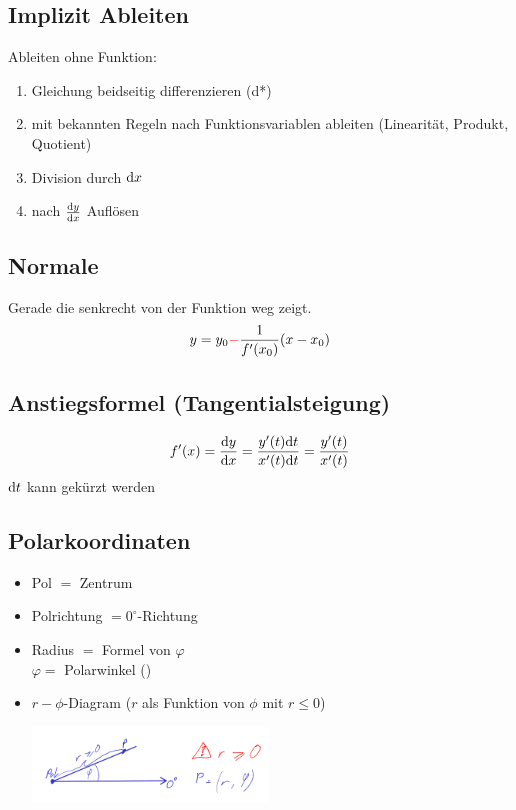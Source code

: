 \subsection{Implizit Ableiten}
Ableiten ohne Funktion:
\begin{enumerate}
\item Gleichung beidseitig differenzieren (d*)
\item mit bekannten Regeln nach Funktionsvariablen ableiten (Linearität, Produkt, Quotient)
\item Division durch $\mathrm{d}x$
\item nach $\frac{\mathrm{d}y}{\mathrm{d}x}$ Auflösen
\end{enumerate}

\subsection{Normale}
Gerade die senkrecht von der Funktion weg zeigt.
\[
y = y_0{\color{red}-}\frac{1}{f'(x_0)}(x-x_0)
\]

\subsection{Anstiegsformel (Tangentialsteigung)}
\[
f'(x)=\frac{\mathrm{d}y}{\mathrm{d}x}=\frac{y'(t)\mathrm{d}t}{x'(t)\mathrm{d}t}=\frac{y'(t)}{x'(t)}
\]
$\mathrm{d}t$ kann gekürzt werden

\subsection{Polarkoordinaten}
\begin{itemize}
\item Pol $=$ Zentrum
\item Polrichtung $= 0^{\circ}$-Richtung
\item Radius $=$ Formel von $\varphi$\\
$\varphi = $ Polarwinkel ()
\end{itemize}

\begin{itemize}
\item $r-\phi$-Diagram ($r$ als Funktion von $\phi$ mit $r\leq 0$)
\begin{center}
    \includegraphics[height=2cm]{graphics/r-phi-graph.png}
\end{center}
\end{itemize}

